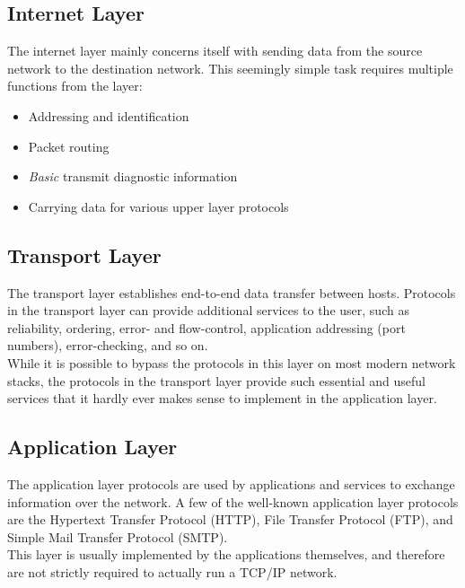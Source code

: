\subsection{Internet Layer}
The internet layer mainly concerns itself with sending data from the source
network to the destination network. This seemingly simple task requires multiple
functions from the layer:
\begin{itemize}
    \item Addressing and identification
    \item Packet routing
    \item \emph{Basic} transmit diagnostic information
    \item Carrying data for various upper layer protocols
\end{itemize}

\subsection{Transport Layer}
The transport layer establishes end-to-end data transfer between hosts.
Protocols in the transport layer can provide additional services to the user,
such as reliability, ordering, error- and flow-control, application addressing
(port numbers), error-checking, and so on.\\
While it is possible to bypass the protocols in this layer on most modern
network stacks, the protocols in the transport layer provide such essential
and useful services that it hardly ever makes sense to implement in the
application layer.


\subsection{Application Layer}
The application layer protocols are used by applications and services to
exchange information over the network. A few of the well-known application
layer protocols are the Hypertext Transfer Protocol (HTTP)\cite{RFC1945},
File Transfer Protocol (FTP)\cite{RFC0114}, and Simple Mail Transfer Protocol
(SMTP)\cite{RFC0788}.\\
This layer is usually implemented by the applications themselves, and therefore
are not strictly required to actually run a TCP/IP network.




